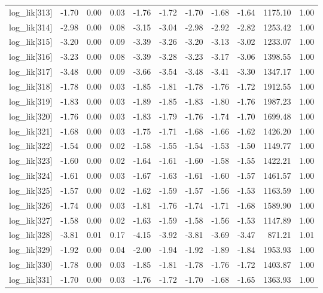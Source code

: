 \begin{table}[ht]
\begin{tabular}{rrrrrrrrrrr}
  log\_lik[313] & -1.70 & 0.00 & 0.03 & -1.76 & -1.72 & -1.70 & -1.68 & -1.64 & 1175.10 & 1.00 \\ 
  log\_lik[314] & -2.98 & 0.00 & 0.08 & -3.15 & -3.04 & -2.98 & -2.92 & -2.82 & 1253.42 & 1.00 \\ 
  log\_lik[315] & -3.20 & 0.00 & 0.09 & -3.39 & -3.26 & -3.20 & -3.13 & -3.02 & 1233.07 & 1.00 \\ 
  log\_lik[316] & -3.23 & 0.00 & 0.08 & -3.39 & -3.28 & -3.23 & -3.17 & -3.06 & 1398.55 & 1.00 \\ 
  log\_lik[317] & -3.48 & 0.00 & 0.09 & -3.66 & -3.54 & -3.48 & -3.41 & -3.30 & 1347.17 & 1.00 \\ 
  log\_lik[318] & -1.78 & 0.00 & 0.03 & -1.85 & -1.81 & -1.78 & -1.76 & -1.72 & 1912.55 & 1.00 \\ 
  log\_lik[319] & -1.83 & 0.00 & 0.03 & -1.89 & -1.85 & -1.83 & -1.80 & -1.76 & 1987.23 & 1.00 \\ 
  log\_lik[320] & -1.76 & 0.00 & 0.03 & -1.83 & -1.79 & -1.76 & -1.74 & -1.70 & 1699.48 & 1.00 \\ 
  log\_lik[321] & -1.68 & 0.00 & 0.03 & -1.75 & -1.71 & -1.68 & -1.66 & -1.62 & 1426.20 & 1.00 \\ 
  log\_lik[322] & -1.54 & 0.00 & 0.02 & -1.58 & -1.55 & -1.54 & -1.53 & -1.50 & 1149.77 & 1.00 \\ 
  log\_lik[323] & -1.60 & 0.00 & 0.02 & -1.64 & -1.61 & -1.60 & -1.58 & -1.55 & 1422.21 & 1.00 \\ 
  log\_lik[324] & -1.61 & 0.00 & 0.03 & -1.67 & -1.63 & -1.61 & -1.60 & -1.57 & 1461.57 & 1.00 \\ 
  log\_lik[325] & -1.57 & 0.00 & 0.02 & -1.62 & -1.59 & -1.57 & -1.56 & -1.53 & 1163.59 & 1.00 \\ 
  log\_lik[326] & -1.74 & 0.00 & 0.03 & -1.81 & -1.76 & -1.74 & -1.71 & -1.68 & 1589.90 & 1.00 \\ 
  log\_lik[327] & -1.58 & 0.00 & 0.02 & -1.63 & -1.59 & -1.58 & -1.56 & -1.53 & 1147.89 & 1.00 \\ 
  log\_lik[328] & -3.81 & 0.01 & 0.17 & -4.15 & -3.92 & -3.81 & -3.69 & -3.47 & 871.21 & 1.01 \\ 
  log\_lik[329] & -1.92 & 0.00 & 0.04 & -2.00 & -1.94 & -1.92 & -1.89 & -1.84 & 1953.93 & 1.00 \\ 
  log\_lik[330] & -1.78 & 0.00 & 0.03 & -1.85 & -1.81 & -1.78 & -1.76 & -1.72 & 1403.87 & 1.00 \\ 
  log\_lik[331] & -1.70 & 0.00 & 0.03 & -1.76 & -1.72 & -1.70 & -1.68 & -1.65 & 1363.93 & 1.00 \\ 

\end{tabular}
\end{table}
